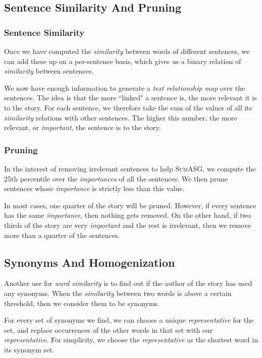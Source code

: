 \subsection{Sentence Similarity And Pruning}

\subsubsection{Sentence Similarity}

Once we have computed the \textit{similarity} between words of different sentences, we can add these up on a per-sentence basis, which gives us a binary relation of \textit{similarity} between sentences.

We now have enough information to generate a \textit{text relationship map} over the sentences. The idea is that the more ``linked" a sentence is, the more relevant it is to the story. For each sentence, we therefore take the sum of the values of all its \textit{similarity} relations with other sentences. The higher this number, the more relevant, or \textit{important}, the sentence is to the story.

\subsubsection{Pruning}

In the interest of removing irrelevant sentences to help \textsc{SumASG}, we compute the 25th percentile over the \textit{importances} of all the sentences. We then prune sentences whose \textit{importance} is strictly less than this value.

In most cases, one quarter of the story will be pruned. However, if every sentence has the same \textit{importance}, then nothing gets removed. On the other hand, if two thirds of the story are very \textit{important} and the rest is irrelevant, then we remove more than a quarter of the sentences.

\subsection{Synonyms And Homogenization}

Another use for \textit{word similarity} is to find out if the author of the story has used any synonyms. When the \textit{similarity} between two words is above a certain threshold, then we consider them to be synonyms.

For every set of synonyms we find, we can choose a unique \textit{representative} for the set, and replace occurrences of the other words in that set with our \textit{representative}. For simplicity, we choose the \textit{representative} as the shortest word in its synonym set.

